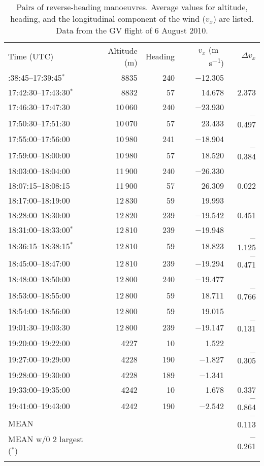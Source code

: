 \documentclass[amtd, online, hvmath]{copernicus}
\begin{document}
\begin{table}[t]
  \caption{Pairs of reverse-heading manoeuvres.
    Average values for altitude, heading, and the longitudinal component
    of the wind ($v_x$) are listed. Data from the GV flight of 6 August
    2010.}
\label{tab:Pairs-of-reverse-heading}
{\begin{tabular}{lrrrr}
\tophline
Time (UTC) & Altitude (m) & Heading & $v_x$ (\unit{m\,s^{-1}}) & $\Delta v_x$\\
\middlehline
17:38:45--17:39:45$^{*}$ & 8835    & 240 & $-$12.305 &          \\
17:42:30--17:43:30$^{*}$ & 8832    & 57  & 14.678    & 2.373    \\
17:46:30--17:47:30       & 10\,060 & 240 & $-$23.930 &          \\
17:50:30--17:51:30       & 10\,070 & 57  & 23.433    & $-$0.497 \\
17:55:00--17:56:00       & 10\,980 & 241 & $-$18.904 &          \\
17:59:00--18:00:00       & 10\,980 & 57  & 18.520    & $-$0.384 \\
18:03:00--18:04:00       & 11\,900 & 240 & $-$26.330 &          \\
18:07:15--18:08:15       & 11\,900 & 57  & 26.309    & 0.022    \\
18:17:00--18:19:00       & 12\,830 & 59  & 19.993    &          \\
18:28:00--18:30:00       & 12\,820 & 239 & $-$19.542 & 0.451    \\
18:31:00--18:33:00$^{*}$ & 12\,810 & 239 & $-$19.948 &          \\
18:36:15--18:38:15$^{*}$ & 12\,810 & 59  & 18.823    & $-$1.125 \\
18:45:00--18:47:00       & 12\,810 & 239 & $-$19.294 & $-$0.471 \\
18:48:00--18:50:00       & 12\,800 & 240 & $-$19.477 &          \\
18:53:00--18:55:00       & 12\,800 & 59  & 18.711    & $-$0.766 \\
18:54:00--18:56:00       & 12\,800 & 59  & 19.015    &          \\
19:01:30--19:03:30       & 12\,800 & 239 & $-$19.147 & $-$0.131 \\
19:20:00--19:22:00       & 4227    & 10  & 1.522     &          \\
19:27:00--19:29:00       & 4228    & 190 & $-$1.827  & $-$0.305 \\
19:28:00--19:30:00       & 4228    & 189 & $-$1.341  &          \\
19:33:00--19:35:00       & 4242    & 10  & 1.678     & 0.337    \\
19:41:00--19:43:00       & 4242    & 190 & $-$2.542  & $-$0.864 \\
\cline{1-5}
MEAN &  &  &  & $-$0.113\\
\cline{1-5}
MEAN w/0 2 largest ($^*$) &  &  &  & $-$0.261\\
\bottomhline
\end{tabular}}
\belowtable{%
}
\end{table}
\end{document}
